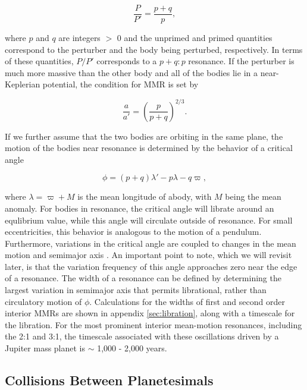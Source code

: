 \begin{equation}\label{eq:per_mmr}
	\frac{P}{P'} = \frac{p + q}{p},
\end{equation}

\noindent where  $p$ and $q$ are integers $>$ 0 and the unprimed and primed quantities correspond to the perturber and the 
body being perturbed, respectively. In terms of these quantities, $P/P'$ corresponds to a $p+q:p$ resonance. If the perturber is 
much more massive than the other body and all of the bodies lie in a near-Keplerian potential, the condition for MMR is set by

\begin{equation}\label{eq:a_mmr}
	\frac{a}{a'} = \left( \frac{p}{p + q} \right)^{2/3}.
\end{equation}

If we further assume that the two bodies are orbiting in the same plane, the motion of the bodies near resonance is determined 
by the behavior of a critical angle

\begin{equation}\label{eq:phi_crit}
	\phi = (p + q) \lambda' - p \lambda - q \varpi,
\end{equation}

\noindent where $\lambda = \varpi + M$ is the mean longitude of abody, with $M$ being the mean anomaly. For bodies in 
resonance, the critical angle will librate around an equlibrium value, while this angle will circulate outside of resonance. For small 
eccentricities, this behavior is analogous to the motion of a pendulum. Furthermore, variations in the critical angle are coupled to 
changes in the mean motion and semimajor axis \cite{murray99}. An important point to note, which we will revisit later, is that the 
variation frequency of this angle approaches zero near the edge of a resonance. The width of a resonance can be defined by 
determining the largest variation in semimajor axis that permits librational, rather than circulatory motion of $\phi$. Calculations 
for the widths of first and second order interior MMRs are shown in appendix \ref{sec:libration}, along with a timescale for the 
libration. For the most prominent interior mean-motion resonances, including the 2:1 and 3:1, the timescale associated with 
these oscillations driven by a Jupiter mass planet is  $\sim$ 1,000 - 2,000 years.

\subsection{Collisions Between Planetesimals}\label{sec:colleq}

